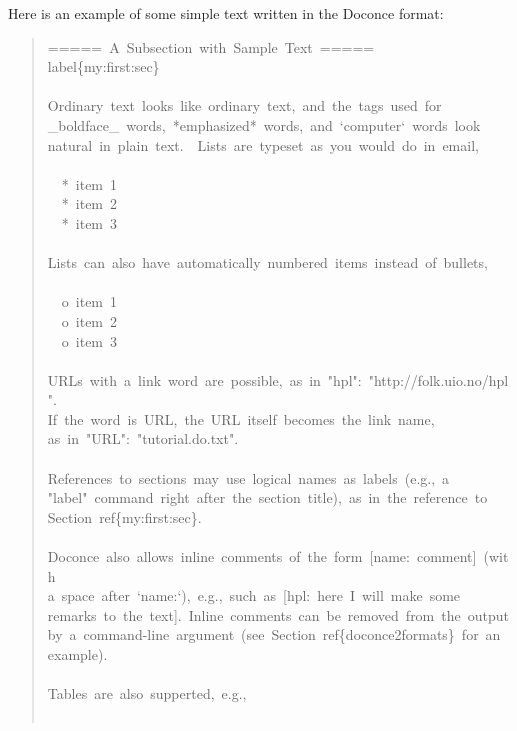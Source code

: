 \documentclass[a4paper]{article}
\begin{document}
Here is an example of some simple text written in the Doconce format:
%
\begin{quote}{\ttfamily \raggedright \noindent
=====~A~Subsection~with~Sample~Text~=====\\
label\{my:first:sec\}\\
~\\
Ordinary~text~looks~like~ordinary~text,~and~the~tags~used~for\\
\_boldface\_~words,~*emphasized*~words,~and~`computer`~words~look\\
natural~in~plain~text.~~Lists~are~typeset~as~you~would~do~in~email,\\
~\\
~~*~item~1\\
~~*~item~2\\
~~*~item~3\\
~\\
Lists~can~also~have~automatically~numbered~items~instead~of~bullets,\\
~\\
~~o~item~1\\
~~o~item~2\\
~~o~item~3\\
~\\
URLs~with~a~link~word~are~possible,~as~in~"hpl":~"http://folk.uio.no/hpl".\\
If~the~word~is~URL,~the~URL~itself~becomes~the~link~name,\\
as~in~"URL":~"tutorial.do.txt".\\
~\\
References~to~sections~may~use~logical~names~as~labels~(e.g.,~a\\
"label"~command~right~after~the~section~title),~as~in~the~reference~to\\
Section~ref\{my:first:sec\}.\\
~\\
Doconce~also~allows~inline~comments~of~the~form~{[}name:~comment{]}~(with\\
a~space~after~`name:`),~e.g.,~such~as~{[}hpl:~here~I~will~make~some\\
remarks~to~the~text{]}.~Inline~comments~can~be~removed~from~the~output\\
by~a~command-line~argument~(see~Section~ref\{doconce2formats\}~for~an\\
example).\\
~\\
Tables~are~also~supperted,~e.g.,\\
~\\
}
\end{quote}
\end{document}
